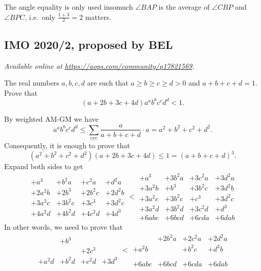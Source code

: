 \documentclass[11pt]{scrartcl}
\begin{document}
\begin{remark*}
  The angle equality is only used insomuch $\angle BAP$
  is the average of $\angle CBP$ and $\angle BPC$,
  i.e.\ only $\frac{1+3}{2} = 2$ matters.
\end{remark*}
\pagebreak

\subsection{IMO 2020/2, proposed by BEL}
\textsl{Available online at \url{https://aops.com/community/p17821569}.}
\begin{mdframed}[style=mdpurplebox,frametitle={Problem statement}]
The real numbers $a, b, c, d$
are such that $a\geq b\geq c\geq d>0$ and $a+b+c+d=1$.
Prove that
\[ (a+2b+3c+4d) a^a b^b c^c d^d < 1. \]
\end{mdframed}
By weighted AM-GM we have
\[ a^a b^b c^c d^d \le \sum_{\text{cyc}} \frac{a}{a+b+c+d} \cdot a
  = a^2+b^2+c^2+d^2. \]
Consequently, it is enough to prove that
\[ (a^2+b^2+c^2+d^2)(a+2b+3c+4d) \le 1 = (a+b+c+d)^3. \]
Expand both sides to get
\[
  \begin{array}{cccc}
    +a^3 &+ b^2a &+ c^2a & +d^2a \\
    +2a^2b &+ 2b^3 &+ 2b^2c  & +2d^2b \\
    +3a^2c & + 3b^2c & + 3c^3 & + 3d^2c \\
    +4a^2d &+ 4b^2d & + 4c^2d & + 4d^3
  \end{array}
  <
  \begin{array}{cccc}
    +a^3 &+ 3b^2a &+ 3c^2a & +3d^2a \\
    +3a^2b &+ b^3 &+ 3b^2c  & +3d^2b \\
    +3a^2c &+ 3b^2c &+ c^3 &+ 3d^2c \\
    +3a^2d &+ 3b^2d &+ 3c^2d &+ d^3 \\
    +6abc &+ 6bcd &+ 6cda &+ 6dab
  \end{array}
\]
In other words, we need to prove that
\[
  \begin{array}{cccc}
    & && \\
    &+ b^3 & & \\
    & & +2c^3 & \\
    +a^2d &+ b^2d & + c^2d & + 3d^3 \\
  \end{array}
  <
  \begin{array}{cccc}
    &+ 2b^2a &+ 2c^2a & +2d^2a \\
    +a^2b & &+ b^2c  & +d^2b \\
    &&& \\
    &&& \\
    +6abc &+ 6bcd &+ 6cda &+ 6dab
  \end{array}
\]
\end{document}
